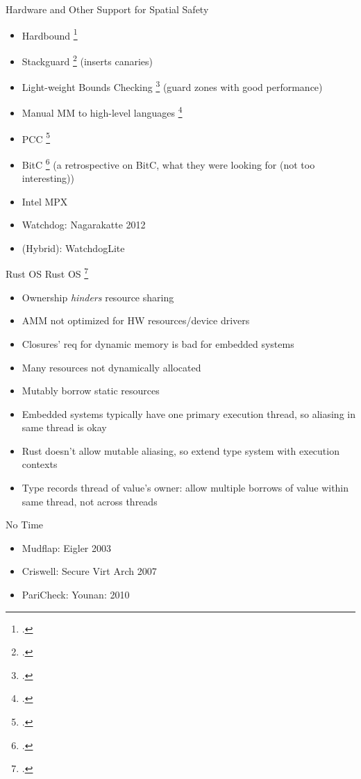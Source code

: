 \documentclass[aspectratio=169]{beamer}
\begin{document}
\begin{frame}{Hardware and Other Support for Spatial Safety}
\begin{itemize}
    \item Hardbound \footcite{devietti_hardbound:_2008}
    \item Stackguard \footcite{cowan_stackguard:_1998} (inserts canaries)
    \item Light-weight Bounds Checking \footcite{hasabnis_light-weight_2012} (guard zones with good performance)
    \item Manual MM to high-level languages \footcite{kedia_simple_2017}
    \item PCC \footcite{necula_proof-carrying_1997}
    \item BitC \footcite{shapiro_origins_2008} (a retrospective on BitC, what they were looking for (not too interesting))
    \item Intel MPX %
    \item Watchdog: Nagarakatte 2012
    \item (Hybrid): WatchdogLite
\end{itemize}
\end{frame}


\begin{frame}{Rust OS}
\footnotesize
Rust OS \footcite{levy_ownership_2015}
    \begin{itemize}
        \item Ownership \emph{hinders} resource sharing
        \item AMM not optimized for HW resources/device drivers
        \item Closures' req for dynamic memory is bad for embedded systems
        \item Many resources not dynamically allocated
        \item Mutably borrow static resources
        \item Embedded systems typically have one primary execution thread, so aliasing in same thread is okay
        \item Rust doesn't allow mutable aliasing, so extend type system with \alert{execution contexts}
        \item Type records thread of value's owner: allow multiple borrows of value within same thread, not across threads
    \end{itemize}
\end{frame}

\begin{frame}{No Time}
\begin{itemize}
  \item Mudflap: Eigler 2003
  \item Criswell: Secure Virt Arch 2007
  \item PariCheck: Younan: 2010
\end{itemize}
\end{frame}
\end{document}
